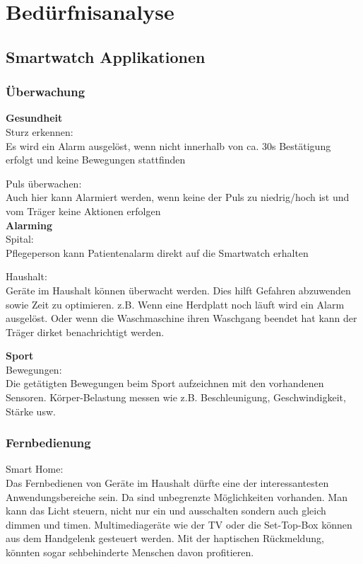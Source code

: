 \chapter{Bedürfnisanalyse}
\section{Smartwatch Applikationen}
\subsection{Überwachung}
\textbf{Gesundheit}\\
Sturz erkennen:\\
Es wird ein Alarm ausgelöst, wenn nicht innerhalb von ca. 30s Bestätigung erfolgt und keine Bewegungen stattfinden

Puls überwachen:\\
Auch hier kann Alarmiert werden, wenn keine der Puls zu niedrig/hoch ist und vom Träger keine Aktionen erfolgen\\

\textbf{Alarming}\\
Spital: \\
Pflegeperson kann Patientenalarm direkt auf die Smartwatch erhalten

Haushalt: \\
Geräte im Haushalt können überwacht werden. Dies hilft Gefahren abzuwenden sowie Zeit zu optimieren.
z.B. Wenn eine Herdplatt noch läuft wird ein Alarm ausgelöst.
Oder wenn die Waschmaschine ihren Waschgang beendet hat kann der Träger dirket benachrichtigt werden.

\textbf{Sport}\\
Bewegungen: \\
Die getätigten Bewegungen beim Sport aufzeichnen mit den vorhandenen Sensoren.
Körper-Belastung messen wie z.B. Beschleunigung, Geschwindigkeit, Stärke usw.

\subsection{Fernbedienung}
Smart Home: \\
Das Fernbedienen von Geräte im Haushalt dürfte eine der interessantesten Anwendungsbereiche sein.
Da sind unbegrenzte Möglichkeiten vorhanden. Man kann das Licht steuern, nicht nur ein und ausschalten sondern auch gleich dimmen und timen.
Multimediageräte wie der TV oder die Set-Top-Box können aus dem Handgelenk gesteuert werden.
Mit der haptischen Rückmeldung, könnten sogar sehbehinderte Menschen davon profitieren.


